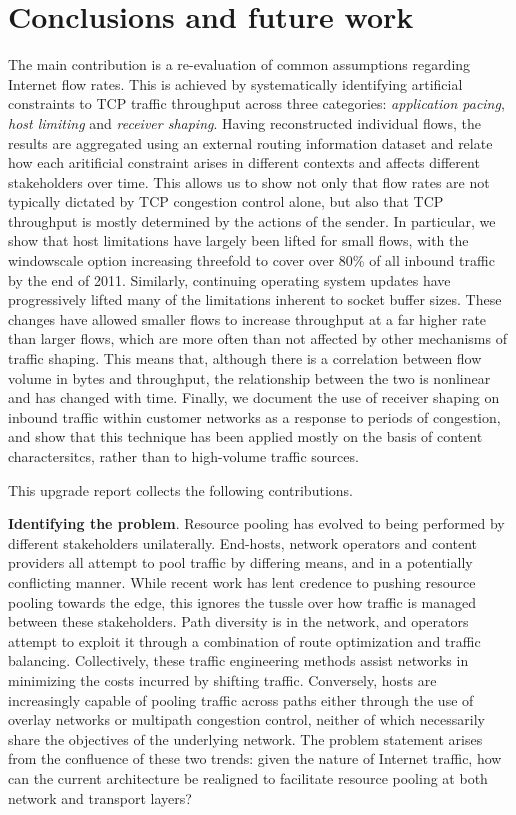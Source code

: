 \chapter{Conclusions and future work}
\label{sec:conclusions}

{\COMMENT

The main contribution is a re-evaluation of common assumptions regarding Internet flow rates. This is achieved by systematically identifying artificial constraints to TCP traffic throughput across three categories: \emph{application pacing}, \emph{host limiting} and \emph{receiver shaping}. 
Having reconstructed individual flows, the results are aggregated using an external routing information dataset and relate how each aritificial constraint arises in different contexts and affects different stakeholders over time. This allows us to show not only that flow rates are not typically dictated by TCP congestion control alone, but also that TCP throughput is mostly determined by the actions of the sender. In particular, we show that host limitations have largely been lifted for small flows, with the windowscale option increasing threefold to cover over 80\% of all inbound traffic by the end of 2011. 
Similarly, continuing operating system updates have progressively lifted many of the limitations inherent to socket buffer sizes. These changes have allowed smaller flows to increase throughput at a far higher rate than larger flows, which are more often than not affected by other mechanisms of traffic shaping.
This means that, although there is a correlation between flow volume in bytes and throughput, the relationship between the two is nonlinear and has changed with time.
Finally, we document the use of receiver shaping on inbound traffic within customer networks as a response to periods of congestion, and show that this technique has been applied mostly on the basis of content charactersitcs, rather than to high-volume traffic sources. 


}


This upgrade report collects the following contributions.

\textbf{Identifying the problem}.
Resource pooling has evolved to being performed by different stakeholders unilaterally.
End-hosts, network operators and content providers all attempt to pool traffic by differing means, and in a potentially conflicting manner.
While recent work has lent credence to pushing resource pooling towards the edge, this ignores the tussle over how traffic is managed between these stakeholders.
Path diversity is in the network, and operators attempt to exploit it through a combination of route optimization and traffic balancing.
Collectively, these traffic engineering methods assist networks in minimizing the costs incurred by shifting traffic.
Conversely, hosts are increasingly capable of pooling traffic across paths either through the use of overlay networks or multipath congestion control, neither of which necessarily share the objectives of the underlying network.
The problem statement arises from the confluence of these two trends: given the nature of Internet traffic, how can the current architecture be realigned to facilitate resource pooling at both network and transport layers?


